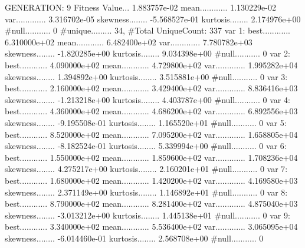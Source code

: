 \documentclass[oneside,letterpaper,titlepage]{article}
\begin{document}
\begin{Schunk}
\begin{Soutput}
GENERATION: 9
Fitness Value... 1.883757e-02
mean............ 1.130229e-02
var............. 3.316702e-05
skewness........ -5.568527e-01
kurtosis........ 2.174976e+00
#null........... 0
#unique......... 34, #Total UniqueCount: 337
var 1:
best............ 6.310000e+02
mean............ 6.482400e+02
var............. 7.780782e+03
skewness........ -1.820285e+00
kurtosis........ 9.034398e+00
#null........... 0
var 2:
best............ 4.090000e+02
mean............ 4.729800e+02
var............. 1.995282e+04
skewness........ 1.394892e+00
kurtosis........ 3.515881e+00
#null........... 0
var 3:
best............ 2.160000e+02
mean............ 3.429400e+02
var............. 8.836416e+03
skewness........ -1.213218e+00
kurtosis........ 4.403787e+00
#null........... 0
var 4:
best............ 4.360000e+02
mean............ 4.686200e+02
var............. 6.892556e+03
skewness........ -9.195508e-01
kurtosis........ 1.165520e+01
#null........... 0
var 5:
best............ 8.520000e+02
mean............ 7.095200e+02
var............. 1.658805e+04
skewness........ -8.182524e-01
kurtosis........ 5.339994e+00
#null........... 0
var 6:
best............ 1.550000e+02
mean............ 1.859600e+02
var............. 1.708236e+04
skewness........ 4.275217e+00
kurtosis........ 2.160201e+01
#null........... 0
var 7:
best............ 1.680000e+02
mean............ 1.420200e+02
var............. 4.169580e+03
skewness........ 2.371149e+00
kurtosis........ 1.146892e+01
#null........... 0
var 8:
best............ 8.790000e+02
mean............ 8.281400e+02
var............. 4.875040e+03
skewness........ -3.013212e+00
kurtosis........ 1.445138e+01
#null........... 0
var 9:
best............ 3.340000e+02
mean............ 5.536400e+02
var............. 3.065095e+04
skewness........ -6.014460e-01
kurtosis........ 2.568708e+00
#null........... 0


\end{Soutput}
\end{Schunk}
\end{document}
